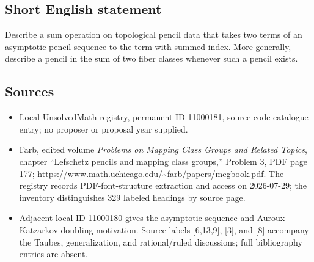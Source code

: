 \documentclass[11pt]{article}
\begin{document}
\subsection{Short English statement}
Describe a sum operation on topological pencil data that takes two terms of an asymptotic pencil sequence to the term with summed index. More generally, describe a pencil in the sum of two fiber classes whenever such a pencil exists.
\subsection{Sources}
\begin{itemize}
\item Local UnsolvedMath registry, permanent ID 11000181, source code catalogue entry; no proposer or proposal year supplied.
\item Farb, edited volume \emph{Problems on Mapping Class Groups and Related Topics}, chapter ``Lefschetz pencils and mapping class groups,'' Problem 3, PDF page 177; \url{https://www.math.uchicago.edu/~farb/papers/mcgbook.pdf}. The registry records PDF-font-structure extraction and access on 2026-07-29; the inventory distinguishes 329 labeled headings by source page.
\item Adjacent local ID 11000180 gives the asymptotic-sequence and Auroux--Katzarkov doubling motivation. Source labels [6,13,9], [3], and [8] accompany the Taubes, generalization, and rational/ruled discussions; full bibliography entries are absent.
\end{itemize}
\end{document}
